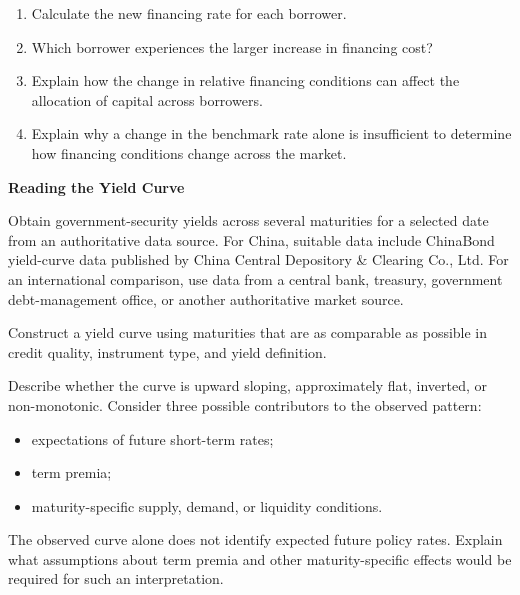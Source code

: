 \begin{enumerate}
\begin{enumerate}
\item Calculate the new financing rate for each borrower.

\item Which borrower experiences the larger increase in financing cost?

\item Explain how the change in relative financing conditions can affect the allocation of capital across borrowers.

\item Explain why a change in the benchmark rate alone is insufficient to determine how financing conditions change across the market.

\end{enumerate}

\end{enumerate}



\textbf{Reading the Yield Curve}

Obtain government-security yields across several maturities for a selected date from an authoritative data source. For China, suitable data include ChinaBond yield-curve data published by China Central Depository \& Clearing Co., Ltd. For an international comparison, use data from a central bank, treasury, government debt-management office, or another authoritative market source.

Construct a yield curve using maturities that are as comparable as possible in credit quality, instrument type, and yield definition.

Describe whether the curve is upward sloping, approximately flat, inverted, or non-monotonic. Consider three possible contributors to the observed pattern:

\begin{itemize}

\item expectations of future short-term rates;

\item term premia;

\item maturity-specific supply, demand, or liquidity conditions.

\end{itemize}

The observed curve alone does not identify expected future policy rates. Explain what assumptions about term premia and other maturity-specific effects would be required for such an interpretation.

